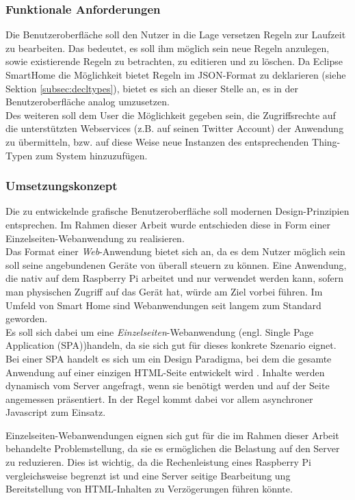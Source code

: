 \subsubsection{Funktionale Anforderungen}
Die Benutzeroberfläche soll den Nutzer in die Lage versetzen Regeln zur Laufzeit zu bearbeiten. Das bedeutet, es soll ihm möglich sein neue Regeln anzulegen, sowie existierende Regeln zu betrachten, zu editieren und zu löschen. Da Eclipse SmartHome die Möglichkeit bietet Regeln im JSON-Format zu deklarieren (siehe Sektion \ref{subsec:decltypes}), bietet es sich an dieser Stelle an, es in der Benutzeroberfläche analog umzusetzen.\\

Des weiteren soll dem User die Möglichkeit gegeben sein, die Zugriffsrechte auf die unterstützten Webservices (z.B. auf seinen Twitter Account) der Anwendung zu übermitteln, bzw. auf diese Weise neue Instanzen des entsprechenden Thing-Typen zum System hinzuzufügen.

\subsubsection{Umsetzungskonzept}
Die zu entwickelnde grafische Benutzeroberfläche soll modernen Design-Prinzipien entsprechen. Im Rahmen dieser Arbeit wurde entschieden diese in Form einer Einzelseiten-Webanwendung zu realisieren. \\

Das Format einer \textit{Web}-Anwendung bietet sich an, da es dem Nutzer möglich sein soll seine angebundenen Geräte von überall steuern zu können. Eine Anwendung, die nativ auf dem Raspberry Pi arbeitet und nur verwendet werden kann, sofern man physischen Zugriff auf das Gerät hat, würde am Ziel vorbei führen. Im Umfeld von Smart Home sind Webanwendungen seit langem zum Standard geworden.\\

Es soll sich dabei um eine \textit{Einzelseiten}-Webanwendung (engl. Single Page Application (SPA))handeln, da sie sich gut für dieses konkrete Szenario eignet. Bei einer SPA handelt es sich um ein Design Paradigma, bei dem die gesamte Anwendung auf einer einzigen HTML-Seite entwickelt wird \cite{gui_sp}. Inhalte werden dynamisch vom Server angefragt, wenn sie benötigt werden und auf der Seite angemessen präsentiert. In der Regel kommt dabei vor allem asynchroner Javascript zum Einsatz.

Einzelseiten-Webanwendungen eignen sich gut für die im Rahmen dieser Arbeit behandelte Problemstellung, da sie es ermöglichen die Belastung auf den Server zu reduzieren. Dies ist wichtig, da die Rechenleistung eines Raspberry Pi vergleichsweise begrenzt ist und eine Server seitige Bearbeitung ung Bereitstellung von HTML-Inhalten zu Verzögerungen führen könnte.\\

